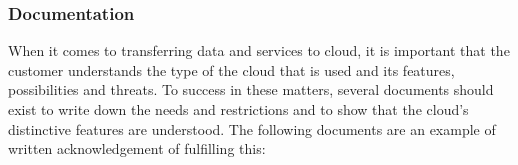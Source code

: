 \documentclass{article}
\begin{document}
\subsubsection{Documentation}
When it comes to transferring data and services to cloud, it is important that the customer understands the type of the cloud that is used and its features, possibilities and threats. To success in these matters, several documents should exist to write down the needs and restrictions and to show that the cloud's distinctive features are understood. The following documents are an example of written acknowledgement of fulfilling this:
\end{document}

